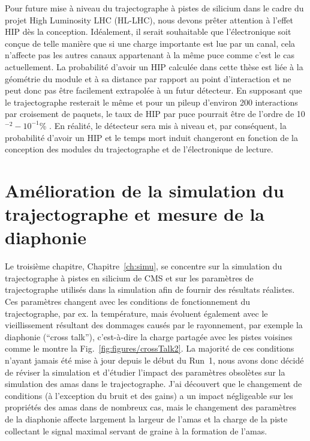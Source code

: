 Pour future mise à niveau du trajectographe à pistes de silicium dans le cadre du projet High Luminosity LHC (HL-LHC), nous devons prêter attention à l’effet HIP dès la conception. Idéalement, il serait souhaitable que l’électronique soit conçue de telle manière que si une charge importante est lue par un canal, cela n’affecte pas les autres canaux appartenant à la même puce comme c’est le cas actuellement. La probabilité d'avoir un HIP calculée dans cette thèse est liée à la géométrie du module et à sa distance par rapport au point d'interaction et ne peut donc pas être facilement extrapolée à  un futur détecteur. En supposant que le trajectographe resterait le même et pour un pileup d'environ 200 interactions par croisement de paquets, le taux de HIP par puce pourrait être de l'ordre de 10$^{-2}-10 ^{-1}$\% . En réalité, le détecteur sera mis à niveau et, par conséquent, la probabilité d'avoir un HIP et le temps mort induit changeront en fonction de la conception des modules du trajectographe et de l’électronique de lecture.

\section{Amélioration de la simulation du trajectographe et mesure de la diaphonie}



Le troisième chapitre, Chapitre~\ref{ch:simu}, se concentre sur la simulation du trajectographe à  pistes en silicium de CMS et sur les paramètres de trajectographe utilisés dans la simulation afin de fournir des résultats réalistes. Ces paramètres changent avec les conditions de fonctionnement du trajectographe, par ex. la température, mais évoluent également avec le vieillissement résultant des dommages causés par le rayonnement, par exemple la diaphonie (``cross talk''), c'est-à-dire la charge partagée avec les pistes voisines comme le montre la Fig.~\ref{fig:figures/crossTalk2}. La majorité de ces conditions n’ayant jamais été mise à jour depuis le début du Run~1, nous avons donc décidé de réviser la simulation et d’étudier l’impact des paramètres obsolètes sur la simulation des amas dans le trajectographe. J'ai découvert que le changement de conditions (à l'exception du bruit et des gains) a un impact négligeable sur les propriétés des amas dans de nombreux cas, mais le changement des paramètres de la diaphonie affecte largement la largeur de l'amas et la charge de la piste collectant le signal maximal servant de graine à la formation de l'amas.


